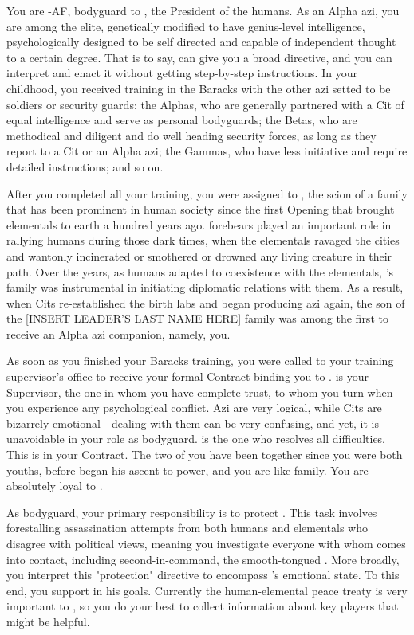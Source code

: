 \documentclass[char]{elementals}
\begin{document}
\name{\cRomeo{}}

You are \cRomeo{\intro}-AF, bodyguard to \cLeader{\intro}, the President of the humans.  As an Alpha azi, you are among the elite, genetically modified to have genius-level intelligence, psychologically designed to be self directed and capable of independent thought to a certain degree.  That is to say, \cLeader{} can give you a broad directive, and you can interpret and enact it without getting step-by-step instructions.  In your childhood, you received training in the Baracks with the other azi setted to be soldiers or security guards: the Alphas, who are generally partnered with a Cit of equal intelligence and serve as personal bodyguards; the Betas, who are methodical and diligent and do well heading security forces, as long as they report to a Cit or an Alpha azi; the Gammas, who have less initiative and require detailed instructions; and so on.

After you completed all your training, you were assigned to \cLeader{}, the scion of a family that has been prominent in human society since the first Opening that brought elementals to earth a hundred years ago.  \cLeader{\Their} forebears played an important role in rallying humans during those dark times, when the elementals ravaged the cities and wantonly incinerated or smothered or drowned any living creature in their path.  Over the years, as humans adapted to coexistence with the elementals, \cLeader{}'s family was instrumental in initiating diplomatic relations with them.  As a result, when Cits re-established the birth labs and began producing azi again, the son of the [INSERT LEADER'S LAST NAME HERE] family was among the first to receive an Alpha azi companion, namely, you.

As soon as you finished your Baracks training, you were called to your training supervisor's office to receive your formal Contract binding you to \cLeader{}.  \cLeader{\They} is your Supervisor, the one in whom you have complete trust, to whom you turn when you experience any psychological conflict.  Azi are very logical, while Cits are bizarrely emotional - dealing with them can be very confusing, and yet, it is unavoidable in your role as bodyguard.  \cLeader{} is the one who resolves all difficulties.  This is in your Contract.  The two of you have been together since you were both youths, before \cLeader{\they} began his ascent to power, and you are like family.  You are absolutely loyal to \cLeader{\them}.

As \cLeader{\their} bodyguard, your primary responsibility is to protect \cLeader{\them}.  This task involves forestalling assassination attempts from both humans and elementals who disagree with 
\cLeader{\their} political views, meaning you investigate everyone with whom \cLeader{\they} comes into contact, including \cLeader{\their} second-in-command, the smooth-tongued \cDema{\intro}.  More broadly, you interpret this "protection" directive to encompass \cLeader{}'s emotional state.  To this end, you support \cLeader{\them} in his goals.  Currently the human-elemental peace treaty is very important to \cLeader{\them}, so you do your best to collect information about key players that might be helpful.
\end{document}

